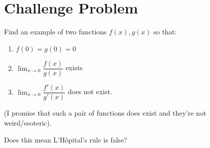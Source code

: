 \documentclass[12pt]{article}
\begin{document}
\section{Challenge Problem}

Find an example of two functions $f(x), g(x)$ so that:
\begin{enumerate}
  \item $f(0) = g(0) = 0$
  \item $\lim_{x \rightarrow 0} \dfrac{f(x)}{g(x)}$ exists
  \item $\lim_{x \rightarrow 0} \dfrac{f'(x)}{g'(x)}$ does not exist.
\end{enumerate}
(I promise that such a pair of functions does exist and they're not weird/esoteric).

Does this mean L'Hôpital's rule is false?


\end{document}
